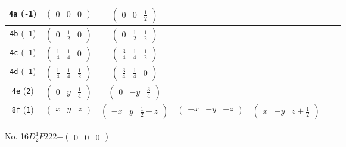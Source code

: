 \documentclass[fleqn,9pt,landscape]{jsarticle}
\begin{document}
\begin{center}
\begin{longtable}{ccccccc}
{\tt 4a} ({\tt -1}) & $ \begin{pmatrix} 0 & 0 & 0 \end{pmatrix} $ & $ \begin{pmatrix} 0 & 0 & \frac{1}{2} \end{pmatrix} $ & $  $ & $  $ \\ \hline
{\tt 4b} ({\tt -1}) & $ \begin{pmatrix} 0 & \frac{1}{2} & 0 \end{pmatrix} $ & $ \begin{pmatrix} 0 & \frac{1}{2} & \frac{1}{2} \end{pmatrix} $ & $  $ & $  $ \\ \hline
{\tt 4c} ({\tt -1}) & $ \begin{pmatrix} \frac{1}{4} & \frac{1}{4} & 0 \end{pmatrix} $ & $ \begin{pmatrix} \frac{3}{4} & \frac{1}{4} & \frac{1}{2} \end{pmatrix} $ & $  $ & $  $ \\ \hline
{\tt 4d} ({\tt -1}) & $ \begin{pmatrix} \frac{1}{4} & \frac{1}{4} & \frac{1}{2} \end{pmatrix} $ & $ \begin{pmatrix} \frac{3}{4} & \frac{1}{4} & 0 \end{pmatrix} $ & $  $ & $  $ \\ \hline
{\tt 4e} ({\tt 2}) & $ \begin{pmatrix} 0 & y & \frac{1}{4} \end{pmatrix} $ & $ \begin{pmatrix} 0 & - y & \frac{3}{4} \end{pmatrix} $ & $  $ & $  $ \\ \hline
{\tt 8f} ({\tt 1}) & $ \begin{pmatrix} x & y & z \end{pmatrix} $ & $ \begin{pmatrix} - x & y & \frac{1}{2} - z \end{pmatrix} $ & $ \begin{pmatrix} - x & - y & - z \end{pmatrix} $ & $ \begin{pmatrix} x & - y & z + \frac{1}{2} \end{pmatrix} $ \\
\end{longtable}
\end{center}
\newpage
No. 16\quad$D_{2}^{1}$\quad$P222$\quad[ orthorhombic ]\quad$+\begin{pmatrix} 0 & 0 & 0 \end{pmatrix}$
\end{document}
